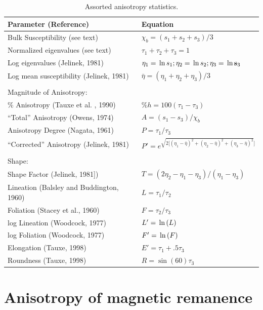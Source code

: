   




  
 
\begin{table}[htb]
\begin{center}
\caption{Assorted anisotropy statistics.}
\label{table:params}
\begin{tabular}{ll}
\hline
Parameter (Reference) & Equation\\
\hline
Bulk Susceptibility (see text) &$\chi_b=(s_1+s_2+s_3)/3$\\
Normalized eigenvalues (see text) &$\tau_1+\tau_2+\tau_3=1$\\
Log eigenvalues (Jelinek, 1981)&$\eta_1=\,\hbox{ln}\, s_1; \eta_2=\,\hbox{ln}\, s_2; \eta_3=\,\hbox{ln}\,
\hbox{\bf s}_3$\\
Log mean susceptibility (Jelinek, 1981)&$\bar \eta=(\eta_1+\eta_2+\eta_3)/3$\\
\\
Magnitude of Anisotropy:\\
\% Anisotropy (Tauxe et al. , 1990) & $\%h = 100(\tau_1-\tau_3)$\\
 ``Total'' Anisotropy (Owens, 1974)&$A=(s_1-s_3)/\chi_b$\\
Anisotropy Degree  (Nagata, 1961)&$P=\tau_1/\tau_3$\\
``Corrected'' Anisotropy (Jelinek, 1981)&$P'=e^{\sqrt{2[(\eta_1-\bar \eta)^2 +(\eta_2-\bar \eta)^2 +(\eta_3-\bar \eta)^2}]}$ \\
\\
Shape:\\
Shape Factor (Jelinek, 1981])&$T=(2\eta_2-\eta_1-\eta_3)/(\eta_1-\eta_3)$\\
 Lineation (Balsley and Buddington, 1960)&$L=\tau_1/\tau_2$\\
Foliation  (Stacey et al., 1960)&$F=\tau_2/\tau_3$\\
 log Lineation  (Woodcock, 1977)&$L'=\,\hbox{ln}\, (L)$\\
log Foliation  (Woodcock, 1977)&$F'=\,\hbox{ln}\, (F)$\\
 Elongation  (Tauxe, 1998)&$E'=\tau_1+.5\tau_3$\\
 Roundness  (Tauxe, 1998)&$R=\sin(60)\tau_3$\\
\hline
\end{tabular}
\end{center}
\end{table}
 
 
 \section{Anisotropy of magnetic remanence}
 
